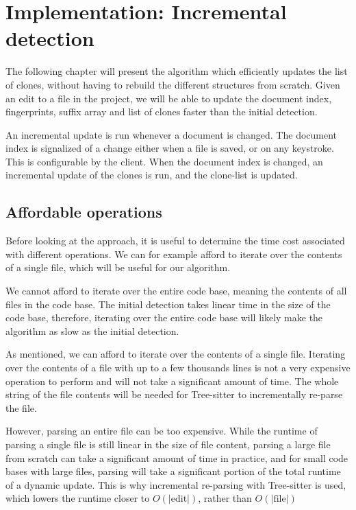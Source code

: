 \chapter{Implementation: Incremental detection}
\label{dynamicdetection}

The following chapter will present the algorithm which efficiently updates the list of
clones, without having to rebuild the different structures from scratch. Given an edit
to a file in the project, we will be able to update the document index, fingerprints,
suffix array and list of clones faster than the initial detection.

An incremental update is run whenever a document is changed. The document index is
signalized of a change either when a file is saved, or on any keystroke. This is
configurable by the client. When the document index is changed, an incremental update of
the clones is run, and the clone-list is updated.

\section{Affordable operations}

Before looking at the approach, it is useful to determine the time cost associated with
different operations. We can for example afford to iterate over the contents of a
single file, which will be useful for our algorithm. 

We cannot afford to iterate over the entire code base, meaning the contents of all files
in the code base. The initial detection takes linear time in the size of the code base,
therefore, iterating over the entire code base will likely make the algorithm as slow as
the initial detection.

As mentioned, we can afford to iterate over the contents of a single file. Iterating over
the contents of a file with up to a few thousands lines is not a very expensive operation
to perform and will not take a significant amount of time. The whole string of the file
contents will be needed for Tree-sitter to incrementally re-parse the file.

However, parsing an entire file can be too expensive. While the runtime of parsing a
single file is still linear in the size of file content, parsing a large file from scratch
can take a significant amount of time in practice, and for small code bases with large
files, parsing will take a significant portion of the total runtime of a dynamic update.
This is why incremental re-parsing with Tree-sitter is used, which lowers the runtime
closer to $O(\vert \text{edit}\vert)$, rather than $O(\vert \text{file} \vert)$

